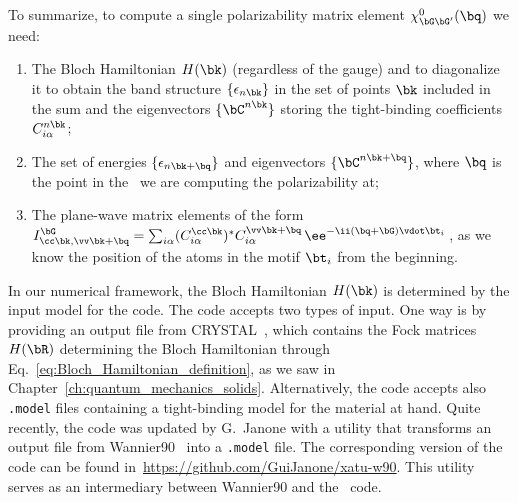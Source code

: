 To summarize, to compute a single polarizability matrix element $\chi^0_{\bG \bG'} (\bq)$ we need:

\begin{enumerate}
    \item The Bloch Hamiltonian $H(\bk)$ (regardless of the gauge) and to diagonalize it to obtain the band structure $\{\epsilon_{n \bk}\}$ in the set of points $\bk$ included in the sum and the eigenvectors $\{\bC^{n \bk}\}$ storing the tight-binding coefficients $C^{n \bk}_{i \alpha}$;
    \item The set of energies $\{\epsilon_{n \bk + \bq} \}$ and eigenvectors $\{\bC^{n \bk + \bq}\}$, where $\bq$ is the point in the \bz~we are computing the polarizability at;
    \item The plane-wave matrix elements of the form $I^{\bG}_{\cc \bk, \vv \bk + \bq} = \sum_{i \alpha} (C_{i \alpha}^{\cc \bk})^* C_{i \alpha}^{\vv \bk + \bq}\,  \ee^{-\ii (\bq + \bG)  \vdot \bt_i}$\,, as we know the position of the atoms in the motif $\bt_i$ from the beginning.
\end{enumerate}

In our numerical framework, the Bloch Hamiltonian $H(\bk)$ is determined by the input model for the code.
The code accepts two types of input.
One way is by providing an output file from \textsc{CRYSTAL}~\cite{CRYSTAL_23}, which contains the Fock matrices $H(\bR)$ determining the Bloch Hamiltonian through Eq.~\eqref{eq:Bloch_Hamiltonian_definition}, as we saw in Chapter~\ref{ch:quantum_mechanics_solids}.
Alternatively, the code accepts also \texttt{.model} files containing a tight-binding model for the material at hand.
Quite recently, the code was updated by G.~Janone with a utility that transforms an output file from Wannier90~\cite{Wannier90} into a \texttt{.model} file.
The corresponding version of the code can be found in~\url{https://github.com/GuiJanone/xatu-w90}.
This utility serves as an intermediary between Wannier90 and the \xatu~code.

